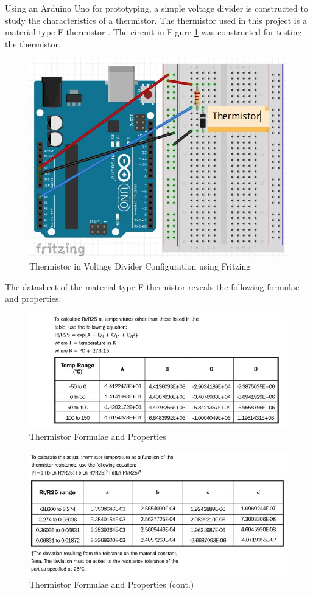 Using an Arduino Uno for prototyping, a simple voltage divider is constructed to study the characteristics of a thermistor. The thermistor used in this project is a material type F thermistor \cite{thermistor}. The circuit in Figure \ref{temperaturefritzing1} was constructed for testing the thermistor. 

\begin{figure}[H]
	\centering
	\includegraphics[width=0.5\linewidth]{temperaturefritzing1.jpg}
	\caption{Thermistor in Voltage Divider Configuration using Fritzing}
	\label{temperaturefritzing1}
\end{figure}

The datasheet of the material type F thermistor \cite{thermistor} reveals the following formulae and properties: 

\begin{figure}[H]
	\centering
	\includegraphics[width=0.8\linewidth]{thermistordatasheet2.jpg}
	\caption{Thermistor Formulae and Properties \cite{thermistor}}
	\label{thermistordatasheet2}
\end{figure}

\begin{figure}[H]
	\centering
	\includegraphics[width=0.8\linewidth]{thermistordatasheet3.jpg}
	\caption{Thermistor Formulae and Properties (cont.) \cite{thermistor}}
	\label{thermistordatasheet3}
\end{figure}

